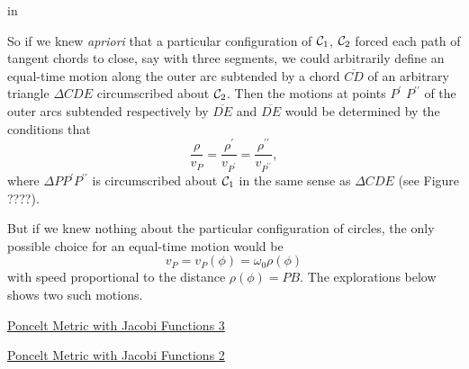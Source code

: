 \documentclass{ximera}
\newcommand{\pskip}{\vskip 0.1 in}
\begin{document}
\begin{onlineOnly}
    \begin{center}
\end{center}
\end{onlineOnly}

\pskip

So if we knew \emph{apriori} that a particular configuration of ${\cal C}_1$, ${\cal C}_2$ forced each path of tangent chords to close, say with three segments, we could arbitrarily define an equal-time motion along the outer arc subtended by a chord $\overline{CD}$ of an arbitrary triangle $\Delta CDE$ circumscribed about ${\cal C}_2$. Then the motions at points $P^\prime$ $P^{\prime\prime}$ of the outer arcs subtended respectively by $\overline{DE}$ and $\overline{DE}$ would be determined by the conditions that
\[
       \frac{\rho}{v_P} = \frac{\rho^\prime}{v_{P^\prime}} = \frac{\rho^{\prime\prime}}{v_{P^{\prime\prime}}},
\]
where $\Delta PP^\prime P^{\prime\prime}$ is circumscribed about ${\cal C}_1$ in the same sense as $\Delta CDE$ (see Figure ????).

But if we knew nothing about the particular configuration of circles, the only possible choice for an equal-time motion would be
\begin{equation}
    v_P =  v_P(\phi) = \omega_0 \rho(\phi)   \label{Eq:EqualTime8}
\end{equation}
with speed proportional to the distance $\rho(\phi) = PB$. The explorations below shows two such motions.

\begin{exploration}
\begin{onlineOnly}
    \begin{center}
\end{center}
\end{onlineOnly}

\href{https://www.desmos.com/calculator/l7oadgwyva}{Poncelt Metric with Jacobi Functions 3} %
\end{exploration}


\begin{exploration}
\begin{onlineOnly}
    \begin{center}
\end{center}
\end{onlineOnly}

\href{https://www.desmos.com/calculator/hm5zop04ob}{Poncelt Metric with Jacobi Functions 2}
\end{exploration}
\end{document}
